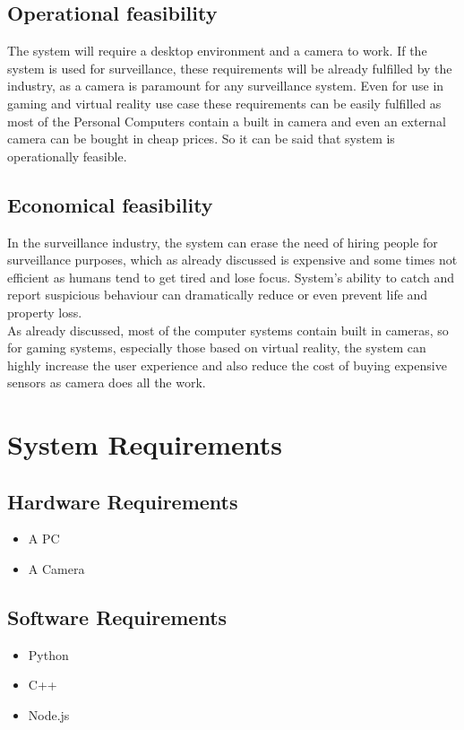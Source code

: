 \documentclass[11pt]{article}
\begin{document}
\subsection{\textbf{Operational feasibility}}
The system will require a desktop environment and a camera to work. If the system is used for surveillance, these requirements will be already fulfilled by the industry, as a camera is paramount for any surveillance system. Even for use in gaming and virtual reality use case these requirements can be easily fulfilled as most of the Personal Computers contain a built in camera and even an external camera can be bought in cheap prices. So it can be said that system is operationally feasible. 
\subsection{\textbf{Economical feasibility}}
In the surveillance industry, the system can erase the need of hiring people for surveillance purposes, which as already discussed is expensive and some times not efficient as humans tend to get tired and lose focus. System's ability to catch and report suspicious behaviour can dramatically reduce or even prevent life and property loss.\\
As already discussed, most of the computer systems contain built in cameras, so for gaming systems, especially those based on virtual reality, the system can highly increase the user experience and also reduce the cost of buying expensive sensors as camera does all the work. 
\section{\textbf{System Requirements}}
\subsection{\textbf{Hardware Requirements}}
\begin{itemize}
    \item A PC
    \item A Camera
\end{itemize}
\subsection{\textbf{Software Requirements}}
\begin{itemize}
    \item Python 
    \item C++ 
    \item Node.js
\end{itemize}
\end{document}

